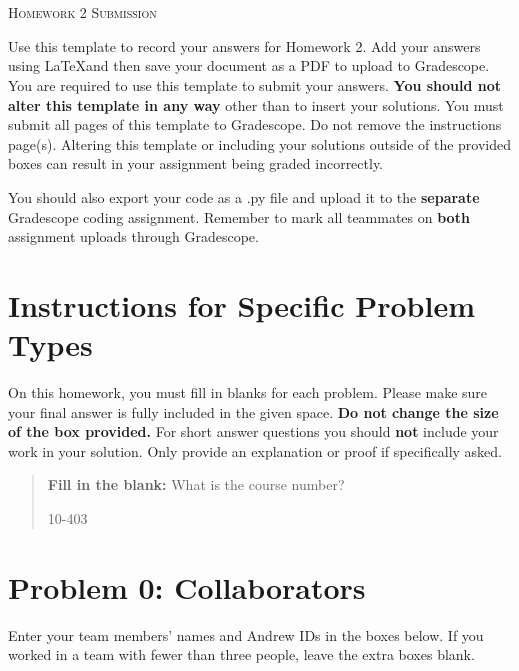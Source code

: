 \documentclass[12pt]{article}
\begin{document}
\section*{}
\begin{center}
  \centerline{\textsc{\LARGE  Homework 2 Submission}}
\end{center}

Use this template to record your answers for Homework 2.  Add your answers using \LaTeX and then save your document as a PDF to upload to Gradescope.  You are required to use this template to submit your answers.  \textbf{You should not alter this template in any way} other than to insert your solutions.  You must submit all \pageref{LastPage} pages of this template to Gradescope.  Do not remove the instructions page(s).  Altering this template or including your solutions outside of the provided boxes can result in your assignment being graded incorrectly.

You should also export your code as a .py file and upload it to the \textbf{separate} Gradescope coding assignment. Remember to mark all teammates on \textbf{both} assignment uploads through Gradescope.

\section*{Instructions for Specific Problem Types}

On this homework, you must fill in blanks for each problem. Please make sure your final answer is fully included in the given space.  \textbf{Do not change the size of the box provided.}  For short answer questions you should \textbf{not} include your work in your solution.  Only provide an explanation or proof if specifically asked.

\begin{quote}
\textbf{Fill in the blank:} What is the course number?

\begin{tcolorbox}[fit,height=1cm, width=4cm, blank, borderline={1pt}{-2pt},nobeforeafter]
    \begin{center}\huge10-403\end{center}
    \end{tcolorbox}
\end{quote}

\newpage

\section*{Problem 0: Collaborators}
Enter your team members' names and Andrew IDs in the boxes below. If you worked in a team with fewer than three people, leave the extra boxes blank.
\end{document}

